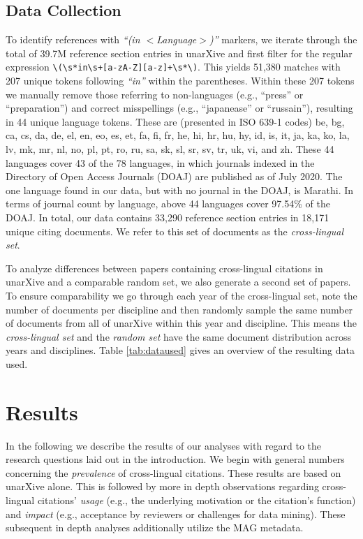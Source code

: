 \subsection{Data Collection}\label{sec:datacollectionsub}
To identify references with \textit{``(in $<$Language$>$)''} markers, we iterate through the total of 39.7M reference section entries in unarXive and first filter for the regular expression \verb|\(\s*in\s+[a-zA-Z][a-z]+\s*\)|. This yields 51,380 matches with 207 unique tokens following \textit{``in''} within the parentheses. Within these 207 tokens we manually remove those referring to non-languages (e.g., ``press'' or ``preparation'') and correct misspellings (e.g., ``japanease'' or ``russain''), resulting in 44 unique language tokens. These are (presented in ISO 639-1 codes) be, bg, ca, cs, da, de, el, en, eo, es, et, fa, fi, fr, he, hi, hr, hu, hy, id, is, it, ja, ka, ko, la, lv, mk, mr, nl, no, pl, pt, ro, ru, sa, sk, sl, sr, sv, tr, uk, vi, and zh. These 44 languages cover 43 of the 78 languages, in which journals indexed in the Directory of Open Access Journals (DOAJ) are published as of July 2020. The one language found in our data, but with no journal in the DOAJ, is Marathi. In terms of journal count by language, above 44 languages cover 97.54\% of the DOAJ. In total, our data contains 33,290 reference section entries in 18,171 unique citing documents. We refer to this set of documents as the \emph{cross-lingual set}.

To analyze differences between papers containing cross-lingual citations in unarXive and a comparable random set, we also generate a second set of papers. To ensure comparability we go through each year of the cross-lingual set, note the number of documents per discipline and then randomly sample the same number of documents from all of unarXive within this year and discipline. This means the \emph{cross-lingual set} and the \emph{random set} have the same document distribution across years and disciplines. Table \ref{tab:dataused} gives an overview of the resulting data used.

\section{Results}\label{sec:results}

In the following we describe the results of our analyses with regard to the research questions laid out in the introduction. We begin with general numbers concerning the \emph{prevalence} of cross-lingual citations. These results are based on unarXive alone. This is followed by more in depth observations regarding cross-lingual citations' \emph{usage} (e.g., the underlying motivation or the citation's function) and \emph{impact} (e.g., acceptance by reviewers or challenges for data mining). These subsequent in depth analyses additionally utilize the MAG metadata.

